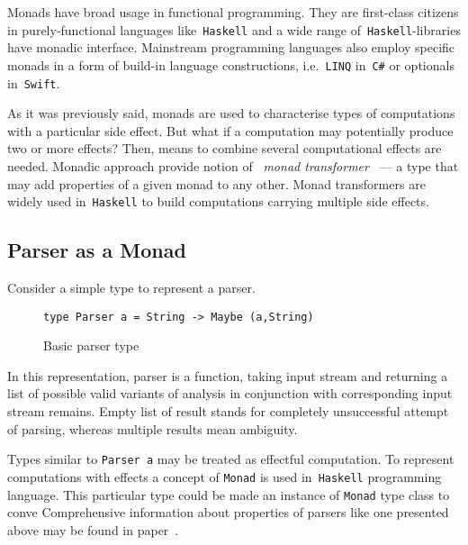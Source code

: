       Monads have broad usage in functional programming. They are first-class citizens
      in purely-functional languages like~\texttt{Haskell} and a wide range of~\texttt{Haskell}-libraries have monadic interface. Mainstream programming languages also
      employ specific monads in a form of build-in language constructions,
      i.e.~\texttt{LINQ} in~\texttt{C\#} or optionals in~\texttt{Swift}.

      As it was previously said, monads are used to characterise types of computations with a particular side effect. But what if a computation may
      potentially produce two or more effects? Then, means to combine several
      computational effects are needed. Monadic approach provide notion of
      ~\emph{monad transformer}~\cite{Liang:1995:MTM:199448.199528} --- a type that
      may add properties of a given monad to any other. Monad transformers are widely
      used in~\texttt{Haskell} to build computations carrying multiple side effects.


    \subsection{Parser as a Monad}

      Consider a simple type to represent a parser.

      \begin{figure}[t]
      \begin{lstlisting}
type Parser a = String -> Maybe (a,String)
      \end{lstlisting}
      \caption{Basic parser type}
      \label{listing:maybeParser}
      \end{figure}

      In this representation, parser is a
      function, taking input stream and returning a list of possible valid
      variants of analysis in conjunction with corresponding input stream
      remains. Empty list of result stands for completely unsuccessful attempt of
      parsing, whereas multiple results mean ambiguity.

      Types similar to \texttt{Parser a} may be treated as effectful computation.
      To represent computations with effects a concept of
      \texttt{Monad} is used in~\texttt{Haskell} programming language. This particular
      type could be made an instance of \texttt{Monad} type class to conve
      Comprehensive information about properties of parsers like one presented
      above may be found in paper~\cite{monParsing}.



